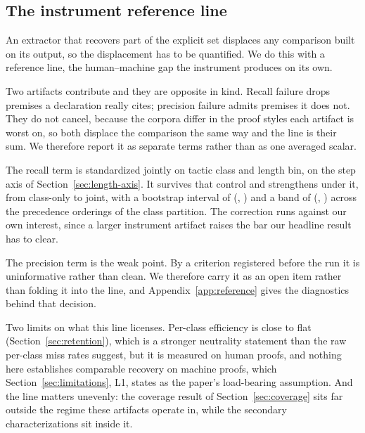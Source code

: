 
\subsection{The instrument reference line}
\label{sec:reference-line}

An extractor that recovers part of the explicit set displaces any comparison
built on its output, so the displacement has to be quantified. We do this with
a reference line, the human--machine gap the instrument produces on its own.

Two artifacts contribute and they are opposite in kind. Recall failure drops
premises a declaration really cites; precision failure admits premises it does
not. They do not cancel, because the corpora differ in the proof styles each
artifact is worst on, so both displace the comparison the same way and the line
is their sum. We therefore report it as separate terms rather than as one
averaged scalar.

The recall term is standardized jointly on tactic class and length bin, on the
step axis of Section~\ref{sec:length-axis}. It survives that control and
strengthens under it, from \recallTermClassOnly{} class-only to
\recallTermJoint{} joint, with a bootstrap interval of (\recallTermCIlow{},
\recallTermCIhigh{}) and a band of (\recallTermBandLow{},
\recallTermBandHigh{}) across the precedence orderings of the class partition.
The correction runs against our own interest, since a larger instrument
artifact raises the bar our headline result has to clear.

The precision term is the weak point. By a criterion registered before the run
it is uninformative rather than clean. We therefore carry it as an open item
rather than folding it into the line, and Appendix~\ref{app:reference} gives
the diagnostics behind that decision.

Two limits on what this line licenses. Per-class efficiency is close to flat
(Section~\ref{sec:retention}), which is a stronger neutrality statement than
the raw per-class miss rates suggest, but it is measured on human proofs,
and nothing here establishes comparable recovery on machine proofs, which
Section~\ref{sec:limitations}, L1, states as the paper's load-bearing
assumption. And the line matters unevenly: the coverage result of
Section~\ref{sec:coverage} sits far outside the regime these artifacts operate
in, while the secondary characterizations sit inside it.
